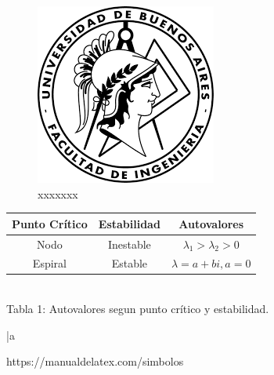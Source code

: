 
\begin{figure}[H]
    \centering
    \includegraphics[tamaño]{Fotos/logo fiuba.png}
    \caption{xxxxxxx}
\end{figure}

\begin{table}[H]
    \centering
    \begin{tabular}{| c | c | c |}\hline
    \textbf{Punto Crítico} & \textbf{Estabilidad} & \textbf{Autovalores} \\ \hline
    Nodo & Inestable & $\lambda_{1} >\lambda_{2} > 0$           \\ \hline
    Espiral & Estable &$\lambda = a +bi, a=0$           \\ \hline
\end{tabular}
    \\Tabla 1: Autovalores segun punto crítico y estabilidad.
\end{table}

\renewcommand{\thesubsection}{\thesection.\alph{subsection}}


\textbf{}
\textit{}
\textsc{}
\underline
{}
\bar{a} 
\ul{} %
\texttt{} %

https://manualdelatex.com/simbolos


